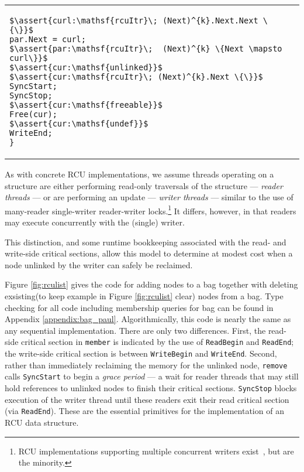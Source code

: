 \begin{figure*}[t!]
\begin{tabular}{p{}p{}}
\begin{lstlisting}[basicstyle=\scriptsize\ttfamily]
$\assert{curl:\mathsf{rcuItr}\; (Next)^{k}.Next.Next \{\}}$
par.Next = curl;
$\assert{par:\mathsf{rcuItr}\;  (Next)^{k} \{Next \mapsto curl\}}$
$\assert{cur:\mathsf{unlinked}}$
$\assert{cur:\mathsf{rcuItr}\; (Next)^{k}.Next \{\}}$
SyncStart;
SyncStop;
$\assert{cur:\mathsf{freeable}}$
Free(cur);
$\assert{cur:\mathsf{undef}}$
WriteEnd;
}
\end{lstlisting}
\end{tabular}
\vspace{-2em}
\caption{Read-Copy-Update Client: Linked-List based Bag Implementation.}
\label{fig:rculist}
\end{figure*}

As with concrete RCU implementations, we assume threads operating on a structure are either performing read-only traversals of the structure --- \emph{reader threads} --- or are performing an update --- \emph{writer threads} --- similar to the use of many-reader single-writer reader-writer locks.\footnote{RCU implementations supporting multiple concurrent writers exist~\cite{Arbel:2014:CUR:2611462.2611471}, but are the minority.}  It differs, however, in that readers may execute concurrently with the (single) writer.

This distinction, and some runtime bookkeeping associated with the read- and write-side critical sections, allow this model to determine at modest cost when a node unlinked by the writer can safely be reclaimed.

Figure \ref{fig:rculist} gives the code for adding nodes to a bag together with deleting exsisting(to keep example in Figure \ref{fig:rculist} clear) nodes from a bag. Type checking for all code including membership queries for bag can be found in Appendix \ref{appendix:bag_paul}. Algorithmically, this code is nearly the same as any sequential implementation. There are only two differences.
First, the read-side critical section in \texttt{member} is indicated by the use of \lstinline|ReadBegin| and \lstinline|ReadEnd|; the write-side critical section is between \lstinline|WriteBegin| and \lstinline|WriteEnd|.
Second, rather than immediately reclaiming the memory for the unlinked node, \texttt{remove} calls \lstinline|SyncStart| to begin a \emph{grace period} --- a wait for reader threads that may still hold references to unlinked nodes to finish their critical sections.
 \lstinline|SyncStop| blocks execution of the writer thread until these readers exit their read critical section (via \lstinline|ReadEnd|). These are the essential primitives for the implementation of an RCU data structure.

